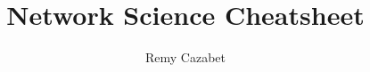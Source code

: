 \documentclass[10pt,a4paper]{article}
\title{\huge{Network Science Cheatsheet}}
\author{\small{Remy Cazabet}}
\date{}
\begin{document}
\small
\begin{multicols}{3}


\thispagestyle{empty}
\scriptsize





% 




% 












% 

% 

%
% 



% 




















































































\end{multicols}
\end{document}
